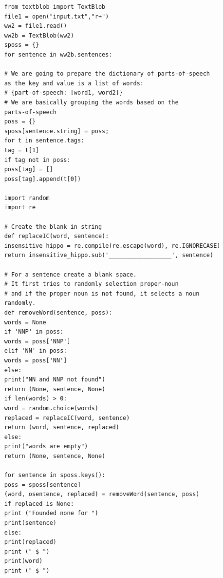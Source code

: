 \begin{verbatim}
	from textblob import TextBlob
	file1 = open("input.txt","r+")
	ww2 = file1.read()
	ww2b = TextBlob(ww2)
	sposs = {}
	for sentence in ww2b.sentences:
	
	# We are going to prepare the dictionary of parts-of-speech
	as the key and value is a list of words:
	# {part-of-speech: [word1, word2]}
	# We are basically grouping the words based on the
	parts-of-speech
	poss = {}
	sposs[sentence.string] = poss;
	for t in sentence.tags:
	tag = t[1]
	if tag not in poss:
	poss[tag] = []
	poss[tag].append(t[0])
	
	import random
	import re
	
	# Create the blank in string
	def replaceIC(word, sentence):
	insensitive_hippo = re.compile(re.escape(word), re.IGNORECASE)
	return insensitive_hippo.sub('__________________', sentence)
	
	# For a sentence create a blank space.
	# It first tries to randomly selection proper-noun 
	# and if the proper noun is not found, it selects a noun
	randomly.
	def removeWord(sentence, poss):
	words = None
	if 'NNP' in poss:
	words = poss['NNP']
	elif 'NN' in poss:
	words = poss['NN']
	else:
	print("NN and NNP not found")
	return (None, sentence, None)
	if len(words) > 0:
	word = random.choice(words)
	replaced = replaceIC(word, sentence)
	return (word, sentence, replaced)
	else:
	print("words are empty")
	return (None, sentence, None)
	
	for sentence in sposs.keys():
	poss = sposs[sentence]
	(word, osentence, replaced) = removeWord(sentence, poss)
	if replaced is None:
	print ("Founded none for ")
	print(sentence)
	else:
	print(replaced)
	print (" $ ")
	print(word)
	print (" $ ")
\end{verbatim}
